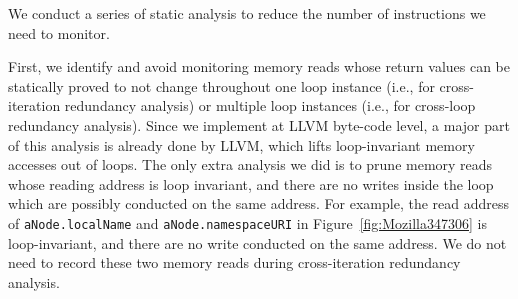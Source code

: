We conduct a series of static analysis to reduce the number of instructions we 
need to monitor. 

First, we identify and avoid monitoring memory reads whose return values can be 
statically proved to
not change throughout one loop instance (i.e., for cross-iteration
redundancy analysis) or multiple loop instances (i.e., for cross-loop redundancy
analysis). Since we implement \Tool at LLVM byte-code level, a major part of this
analysis is already done by LLVM, which lifts loop-invariant memory
accesses out of loops. The only extra analysis we did is to 
prune memory reads whose reading address is loop invariant, and there are no writes 
inside the loop which are possibly conducted on the same address. 
For example, the read address of \texttt{aNode.localName} and \texttt{aNode.namespaceURI}
in Figure~\ref{fig:Mozilla347306} is loop-invariant, and there are no write conducted 
on the same address. 
We do not need to record these two memory reads during cross-iteration redundancy analysis. 



